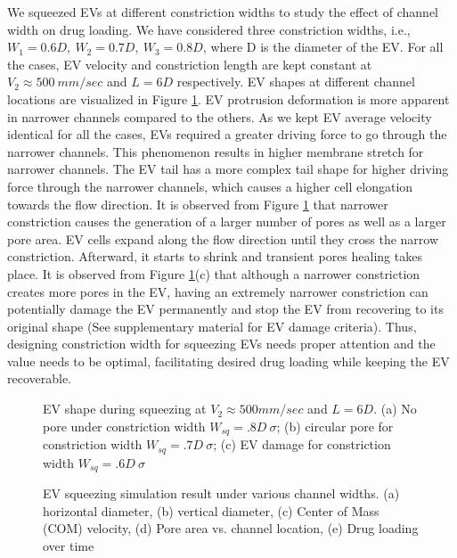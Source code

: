 We squeezed EVs at different constriction widths to study the effect of channel width on drug loading. We have considered three constriction widths, i.e., $W_1=0.6D,\ W_2=0.7D,\ W_3=0.8D$, where D is the diameter of the EV. For all the cases, EV velocity and constriction length are kept constant at $V_2\approx500\ mm/sec$ and $L=6D$ respectively. EV shapes at different channel locations are visualized in Figure \ref{fig:7}. EV protrusion deformation is more apparent in narrower channels compared to the others. As we kept EV average velocity identical for all the cases, EVs required a greater driving force to go through the narrower channels. This phenomenon results in higher membrane stretch for narrower channels. The EV tail has a more complex tail shape for higher driving force through the narrower channels, which causes a higher cell elongation towards the flow direction. It is observed from Figure \ref{fig:7} that narrower constriction causes the generation of a larger number of pores as well as a larger pore area. EV cells expand along the flow direction until they cross the narrow constriction. Afterward, it starts to shrink and transient pores healing takes place. It is observed from Figure \ref{fig:7}(c) that although a narrower constriction creates more pores in the EV, having an extremely narrower constriction can potentially damage the EV permanently and stop the EV from recovering to its original shape (See supplementary material for EV damage criteria). Thus, designing constriction width for squeezing EVs needs proper attention and the value needs to be optimal, facilitating desired drug loading while keeping the EV recoverable.
\\

\begin{figure}[htbp]
  \centering
  
  \vspace{0.5cm}
  \caption{ EV shape during squeezing at $V_2 ≈500 mm/sec$ and $L=6D$. (a) No pore under constriction width $W_{sq}=.8D\ \sigma$; (b) circular pore for constriction width $W_{sq}=.7D\ \sigma$; (c) EV damage for constriction width $W_{sq}=.6D\ \sigma$}
  \label{fig:7}
\end{figure}

\begin{figure}[htbp]
  \centering
  
  \vspace{0.5cm}
  \caption{EV squeezing simulation result under various channel widths. (a)  horizontal diameter, (b) vertical diameter, (c) Center of Mass (COM) velocity, (d) Pore area vs. channel location, (e) Drug loading over time}
  \label{fig:8}
\end{figure}

